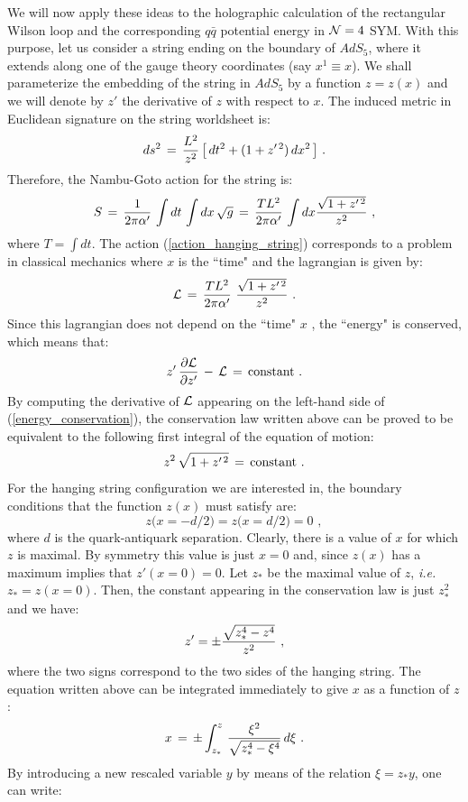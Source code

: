 \documentclass[12pt,notitlepage,a4paper]{article}
\newcommand{\beq}{\begin{equation}}
\newcommand{\eeq}{\end{equation}}
\def\ie{{\emph{i.e.}}}
\begin{document}
We will now apply these ideas to the holographic calculation of the rectangular Wilson loop and the corresponding $q\bar q$ potential energy in ${\cal N}=4$ SYM. With this purpose, 
let us consider a string ending on the boundary of $AdS_5$, where it extends along one of the gauge theory coordinates (say $x^1\equiv x$). 
We shall parameterize the embedding of the string in $AdS_5$ by a function $z=z(x)$ and we will denote by $z'$ the derivative of $z$ with respect to $x$. 
The induced metric in Euclidean signature on the string worldsheet is:
\beq
ds^2\,=\, {L^2\over z^2}\,\big[\,dt^2+(1+z'^{\,2})\,dx^2\,\big]\,\,.
\eeq
Therefore, the Nambu-Goto action for the string is:
\beq
S\,=\,{1\over 2\pi\alpha'}\,\int dt\,\int dx\,\sqrt{g}\,=\,
{T L^2\over 2\pi\alpha'}\,\int dx 
{\sqrt{1+z'^{\,2}}\over z^2}\,\,,
\label{action_hanging_string}
\eeq
where $T=\int dt$. The action (\ref{action_hanging_string}) corresponds to a problem in classical mechanics where $x$ is the ``time"  and the  lagrangian is given by:
\beq
{\cal L}\,=\,{T L^2\over 2\pi\alpha'} \,\,
{\sqrt{1+z'^{\,2}}\over z^2}\,\,.
\eeq
Since this lagrangian does not depend on the  ``time" $x$ , the ``energy" is conserved, which means that: 
\beq
z'\,{\partial {\cal L}\over \partial z'}\,-\,{\cal L}\,=\,{\rm constant}\,\,.
\label{energy_conservation}
\eeq
By computing the derivative of ${\cal L}$ appearing on the left-hand side of (\ref{energy_conservation}), the conservation law written above can be proved to be equivalent to the following first integral of the equation of motion:
\beq
 z^2\,\sqrt{1+z'^{\,2}}\,=\,{\rm constant}\,\,.
 \label{first_integral}
 \eeq
For the hanging string configuration we are interested in, the boundary conditions that the function $z(x)$ must satisfy are:
\beq
z\big(x=-d/2\big)=z\big(x=d/2\big)=0\,\,,
\label{bc_hanging_string}
\eeq
where $d$ is the quark-antiquark separation. 
Clearly, there is a value of $x$ for which $z$ is maximal. By symmetry this value is just 
$x=0$ and, since $z(x)$ has a maximum implies that  $z'(x=0)=0$. Let $z_*$ be the maximal value of $z$, \ie\ $z_*=z(x=0)$. Then, the constant appearing in the conservation law is just $z_*^2$ and we have:
\beq
z'=\pm {\sqrt{z_*^4-z^4}\over z^2}\,\,,
\label{zprime_hanging_string}
\eeq
where the two signs correspond to the two sides of the hanging string. The equation written above can be integrated immediately to give $x$ as a function of $z$:
\beq
x\,=\,\pm \int_{z_*}^{z}\,{\xi^2\over \sqrt{z_*^4-\xi^4}}\,d\xi\,\,.
\eeq
By introducing a new rescaled variable $y$ by means of the relation $\xi=z_* y$, one can write:
\end{document}
